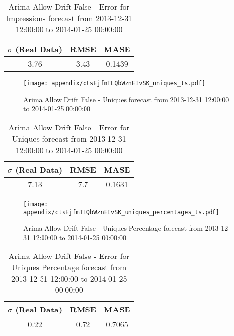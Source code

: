 \begin{table}[H]
\centering
\footnotesize
\begin{tabular}{ccc}
$\sigma$ (Real Data) & RMSE & MASE   \\ \hline
3.76 & 3.43 & 0.1439 \\
\end{tabular}

\vspace{0.5cm}

\caption{
Arima Allow Drift False - Error for Impressions forecast from 2013-12-31 12:00:00 to 2014-01-25 00:00:00}
\end{table}

\begin{figure}[H] \begin{center} \leavevmode
\texttt{[image: appendix/ctsEjfmTLQbWznEIvSK\_uniques\_ts.pdf]} \caption{
Arima Allow Drift False - Uniques forecast from 2013-12-31 12:00:00 to 2014-01-25 00:00:00} \label{fig:appendix/ctsEjfmTLQbWznEIvSK_uniques_ts.pdf} \end{center}
\end{figure}

\begin{table}[H]
\centering
\footnotesize
\begin{tabular}{ccc}
$\sigma$ (Real Data) & RMSE & MASE   \\ \hline
7.13 & 7.7 & 0.1631 \\
\end{tabular}

\vspace{0.5cm}

\caption{
Arima Allow Drift False - Error for Uniques forecast from 2013-12-31 12:00:00 to 2014-01-25 00:00:00}
\end{table}

\begin{figure}[H] \begin{center} \leavevmode
\texttt{[image: appendix/ctsEjfmTLQbWznEIvSK\_uniques\_percentages\_ts.pdf]} \caption{
Arima Allow Drift False - Uniques Percentage forecast from 2013-12-31 12:00:00 to 2014-01-25 00:00:00} \label{fig:appendix/ctsEjfmTLQbWznEIvSK_uniques_percentages_ts.pdf} \end{center}
\end{figure}

\begin{table}[H]
\centering
\footnotesize
\begin{tabular}{ccc}
$\sigma$ (Real Data) & RMSE & MASE   \\ \hline
0.22 & 0.72 & 0.7065 \\
\end{tabular}

\vspace{0.5cm}

\caption{
Arima Allow Drift False - Error for Uniques Percentage forecast from 2013-12-31 12:00:00 to 2014-01-25 00:00:00}
\end{table}


